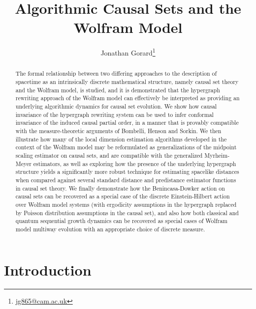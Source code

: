 \documentclass{article}
\title{Algorithmic Causal Sets and the Wolfram Model}
\author{Jonathan Gorard\footnote{\url{jg865@cam.ac.uk}}}
\affil{University of Cambridge, Cambridge, UK}
\begin{document}
\maketitle

\begin{abstract}
The formal relationship between two differing approaches to the description of spacetime as an intrinsically discrete mathematical structure, namely causal set theory and the Wolfram model, is studied, and it is demonstrated that the hypergraph rewriting approach of the Wolfram model can effectively be interpreted as providing an underlying algorithmic dynamics for causal set evolution. We show how causal invariance of the hypergraph rewriting system can be used to infer conformal invariance of the induced causal partial order, in a manner that is provably compatible with the measure-theoretic arguments of Bombelli, Henson and Sorkin. We then illustrate how many of the local dimension estimation algorithms developed in the context of the Wolfram model may be reformulated as generalizations of the midpoint scaling estimator on causal sets, and are compatible with the generalized Myrheim-Meyer estimators, as well as exploring how the presence of the underlying hypergraph structure yields a significantly more robust technique for estimating spacelike distances when compared against several standard distance and predistance estimator functions in causal set theory. We finally demonstrate how the Benincasa-Dowker action on causal sets can be recovered as a special case of the discrete Einstein-Hilbert action over Wolfram model systems (with ergodicity assumptions in the hypergraph replaced by Poisson distribution assumptions in the causal set), and also how both classical and quantum sequential growth dynamics can be recovered as special cases of Wolfram model multiway evolution with an appropriate choice of discrete measure.
\end{abstract}

\newpage

\tableofcontents

\section{Introduction}
\end{document}
